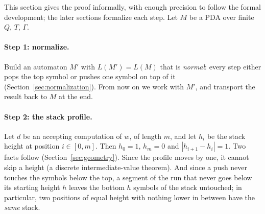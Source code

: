 \documentclass[runningheads]{llncs}
\newcommand{\kG}{\ensuremath{\Gamma}}   %
\begin{document}
This section gives the proof informally, with enough precision to follow the
formal development; the later sections formalize each step. Let $M$ be a PDA
over finite $Q$, $T$, $\kG$.

\paragraph{Step 1: normalize.} Build an automaton $M'$ with $L(M') = L(M)$ that
is \emph{normal}: every step either pops the top symbol or pushes one symbol on
top of it (Section~\ref{sec:normalization}). From now on we work with $M'$, and
transport the result back to $M$ at the end.

\paragraph{Step 2: the stack profile.} Let $d$ be an accepting computation of
$w$, of length $m$, and let $h_i$ be the stack height at position
$i \in [0,m]$. Then $h_0 = 1$, $h_m = 0$ and $|h_{i+1} - h_i| = 1$. Two facts
follow (Section~\ref{sec:geometry}). Since the profile moves by one, it cannot
skip a height (a discrete intermediate-value theorem). And since a push never
touches the symbols below the top, a segment of the run that never goes below
its starting height $h$ leaves the bottom $h$ symbols of the stack untouched; in
particular, two positions of equal height with nothing lower in between have the
\emph{same} stack.
\end{document}
